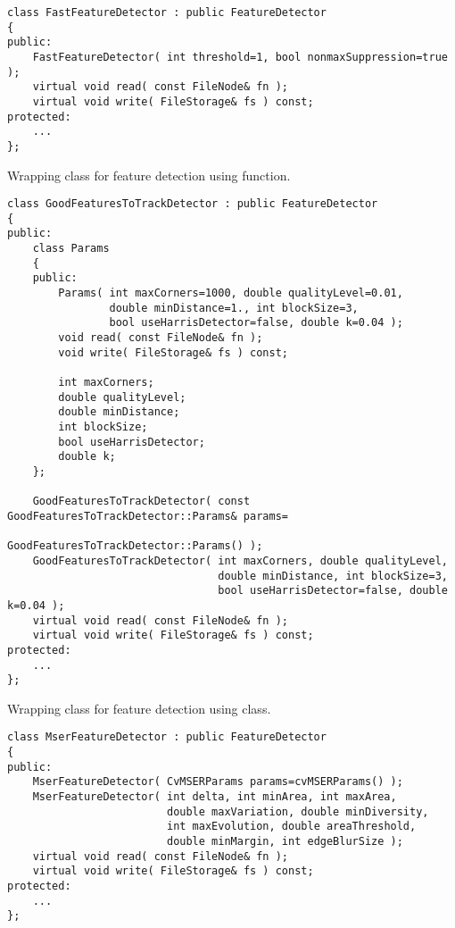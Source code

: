 \begin{lstlisting}
class FastFeatureDetector : public FeatureDetector
{
public:
    FastFeatureDetector( int threshold=1, bool nonmaxSuppression=true );
    virtual void read( const FileNode& fn );
    virtual void write( FileStorage& fs ) const;
protected:
    ...
};
\end{lstlisting}

Wrapping class for feature detection using  function.

\begin{lstlisting}
class GoodFeaturesToTrackDetector : public FeatureDetector
{
public:
    class Params
    {
    public:
        Params( int maxCorners=1000, double qualityLevel=0.01, 
                double minDistance=1., int blockSize=3, 
                bool useHarrisDetector=false, double k=0.04 );
        void read( const FileNode& fn );
        void write( FileStorage& fs ) const;

        int maxCorners;
        double qualityLevel;
        double minDistance;
        int blockSize;
        bool useHarrisDetector;
        double k;
    };

    GoodFeaturesToTrackDetector( const GoodFeaturesToTrackDetector::Params& params=
                                            GoodFeaturesToTrackDetector::Params() );
    GoodFeaturesToTrackDetector( int maxCorners, double qualityLevel, 
                                 double minDistance, int blockSize=3, 
                                 bool useHarrisDetector=false, double k=0.04 );
    virtual void read( const FileNode& fn );
    virtual void write( FileStorage& fs ) const;
protected:
    ...
};
\end{lstlisting}

Wrapping class for feature detection using  class.

\begin{lstlisting}
class MserFeatureDetector : public FeatureDetector
{
public:
    MserFeatureDetector( CvMSERParams params=cvMSERParams() );
    MserFeatureDetector( int delta, int minArea, int maxArea, 
                         double maxVariation, double minDiversity,
                         int maxEvolution, double areaThreshold, 
                         double minMargin, int edgeBlurSize );
    virtual void read( const FileNode& fn );
    virtual void write( FileStorage& fs ) const;
protected:
    ...
};
\end{lstlisting}


